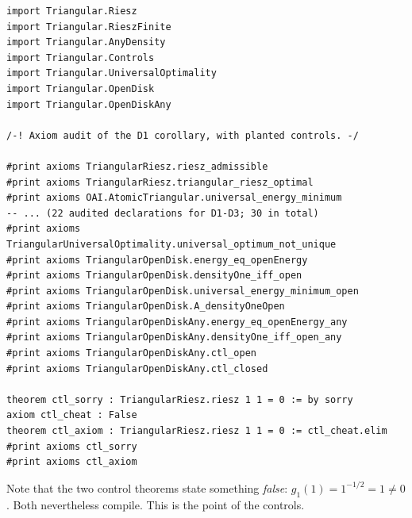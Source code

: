 \begin{leanbox}
\begin{lstlisting}[language=Lean]
import Triangular.Riesz
import Triangular.RieszFinite
import Triangular.AnyDensity
import Triangular.Controls
import Triangular.UniversalOptimality
import Triangular.OpenDisk
import Triangular.OpenDiskAny

/-! Axiom audit of the D1 corollary, with planted controls. -/

#print axioms TriangularRiesz.riesz_admissible
#print axioms TriangularRiesz.triangular_riesz_optimal
#print axioms OAI.AtomicTriangular.universal_energy_minimum
-- ... (22 audited declarations for D1-D3; 30 in total)
#print axioms TriangularUniversalOptimality.universal_optimum_not_unique
#print axioms TriangularOpenDisk.energy_eq_openEnergy
#print axioms TriangularOpenDisk.densityOne_iff_open
#print axioms TriangularOpenDisk.universal_energy_minimum_open
#print axioms TriangularOpenDisk.A_densityOneOpen
#print axioms TriangularOpenDiskAny.energy_eq_openEnergy_any
#print axioms TriangularOpenDiskAny.densityOne_iff_open_any
#print axioms TriangularOpenDiskAny.ctl_open
#print axioms TriangularOpenDiskAny.ctl_closed

theorem ctl_sorry : TriangularRiesz.riesz 1 1 = 0 := by sorry
axiom ctl_cheat : False
theorem ctl_axiom : TriangularRiesz.riesz 1 1 = 0 := ctl_cheat.elim
#print axioms ctl_sorry
#print axioms ctl_axiom
\end{lstlisting}
\end{leanbox}

Note that the two control theorems state something \emph{false}: $g_1(1)=1^{-1/2}=1\neq0$. Both nevertheless compile.
This is the point of the controls.

